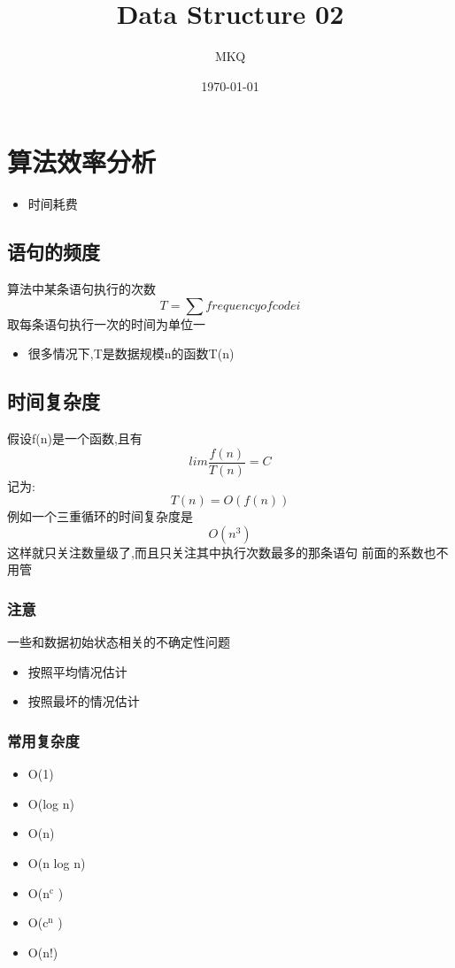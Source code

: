 \documentclass[11pt]{article}
\author{MKQ}
\date{\today}
\title{Data Structure 02}
\begin{document}
\maketitle
\tableofcontents

\section{算法效率分析}
\label{sec:org13214d3}
\begin{itemize}
\item 时间耗费
\end{itemize}

\subsection{语句的频度}
\label{sec:org3e05eab}
算法中某条语句执行的次数
\[
T=\sum frequency of code i
\]
取每条语句执行一次的时间为单位一
\begin{itemize}
\item 很多情况下,T是数据规模n的函数T(n)
\end{itemize}
\subsection{时间复杂度}
\label{sec:org01e76f9}
假设f(n)是一个函数,且有
\[
lim \frac{f(n)}{T(n)}=C
\]
记为:
\[
T(n)=O(f(n))
\]
例如一个三重循环的时间复杂度是
\[
O(n^3)
\]
这样就只关注数量级了,而且只关注其中执行次数最多的那条语句
前面的系数也不用管
\subsubsection{注意}
\label{sec:org7605e1a}
一些和数据初始状态相关的不确定性问题
\begin{itemize}
\item 按照平均情况估计
\item 按照最坏的情况估计
\end{itemize}
\subsubsection{常用复杂度}
\label{sec:org27760d2}
\begin{itemize}
\item O(1)
\item O(log n)
\item O(n)
\item O(n log n)
\item O(n\(^{\text{c}}\) )
\item O(c\(^{\text{n}}\) )
\item O(n!)
\end{itemize}
\end{document}
